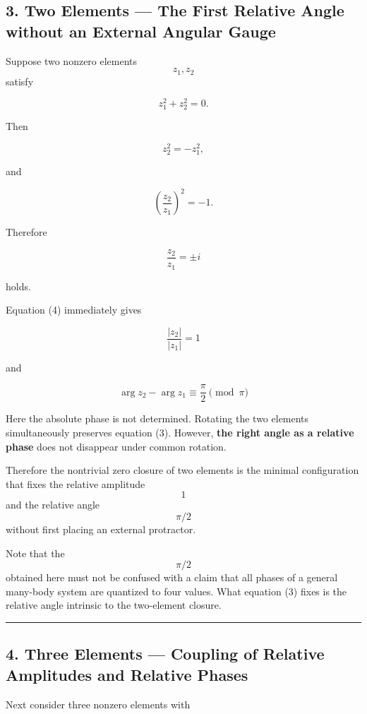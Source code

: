 \documentclass[
  a4paper,
]{article}
\begin{document}
\subsection{3. Two Elements --- The First Relative Angle without an
External Angular
Gauge}\label{two-elements-the-first-relative-angle-without-an-external-angular-gauge}

Suppose two nonzero elements \[z_1,z_2\] satisfy

\[
z_1^2+z_2^2=0.
\tag{3}
\]

Then

\[
z_2^2=-z_1^2,
\]

and

\[
\left(\frac{z_2}{z_1}\right)^2=-1.
\]

Therefore

\[
\boxed{
\frac{z_2}{z_1}=\pm i
}
\tag{4}
\]

holds.

Equation (4) immediately gives

\[
\boxed{
\frac{|z_2|}{|z_1|}=1
}
\tag{5}
\]

and

\[
\boxed{
\arg z_2-\arg z_1
\equiv\frac{\pi}{2}
\pmod{\pi}
}
\tag{6}
\]

Here the absolute phase is not determined. Rotating the two elements
simultaneously preserves equation (3). However, \textbf{the right angle
as a relative phase} does not disappear under common rotation.

Therefore the nontrivial zero closure of two elements is the minimal
configuration that fixes the relative amplitude \[1\] and the relative
angle \[\pi/2\] without first placing an external protractor.

Note that the \[\pi/2\] obtained here must not be confused with a claim
that all phases of a general many-body system are quantized to four
values. What equation (3) fixes is the relative angle intrinsic to the
two-element closure.

\begin{center}\rule{0.5\linewidth}{0.5pt}\end{center}

\subsection{4. Three Elements --- Coupling of Relative Amplitudes and
Relative
Phases}\label{three-elements-coupling-of-relative-amplitudes-and-relative-phases}

Next consider three nonzero elements with
\end{document}
